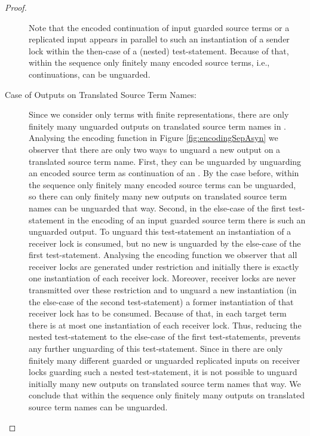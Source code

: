 \documentclass[]{llncs}
\begin{document}
\begin{proof}
\begin{description}
			Note that the encoded continuation of input guarded source terms or a replicated input appears in parallel to such an instantiation of a sender lock within the then-case of a (nested) test-statement. Because of that, within the sequence  only finitely many encoded source terms, i.e., continuations, can be unguarded.
		\item[Case of Outputs on Translated Source Term Names:] Since we consider only terms with finite representations, there are only finitely many unguarded outputs on translated source term names in . Analysing the encoding function in Figure \ref{fig:encodingSepAsyn} we observer that there are only two ways to unguard a new output on a translated source term name. First, they can be unguarded by unguarding an encoded source term as continuation of an \simulation. By the case before, within the sequence  only finitely many encoded source terms can be unguarded, so there can only finitely many new outputs on translated source term names can be unguarded that way. Second, in the else-case of the first test-statement in the encoding of an input guarded source term there is such an unguarded output. To unguard this test-statement an instantiation of a receiver lock is consumed, but no new is unguarded by the else-case of the first test-statement. Analysing the encoding function we observer that all receiver locks are generated under restriction and initially there is exactly one instantiation of each receiver lock. Moreover, receiver locks are never transmitted over these restriction and to unguard a new instantiation (in the else-case of the second test-statement) a former instantiation of that receiver lock has to be consumed. Because of that, in each target term there is at most one instantiation of each receiver lock. Thus, reducing the nested test-statement to the else-case of the first test-statements, prevents any further unguarding of this test-statement. Since in  there are only finitely many different guarded or unguarded replicated inputs on receiver locks guarding such a nested test-statement, it is not possible to unguard initially many new outputs on translated source term names that way. We conclude that within the sequence  only finitely many outputs on translated source term names can be unguarded.

\end{description}
\end{proof}
\end{document}
